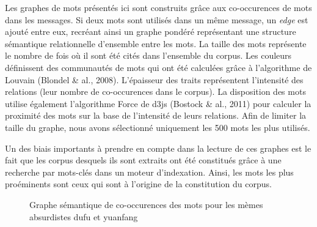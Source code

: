 Les graphes de mots pr\'esent\'es ici sont construits gr\^ace aux
co-occurences de mots dans les messages. Si deux mots sont utilis\'es
dans un m\^eme message, un \textit{edge} est ajout\'e entre eux,
recr\'eant ainsi un graphe pond\'er\'e repr\'esentant une structure
s\'emantique relationnelle d{\textquoteright}ensemble entre les mots.
La taille des mots repr\'esente le nombre de fois o\`u il sont \'et\'e
cit\'es dans l{\textquoteright}ensemble du corpus. Les couleurs
d\'efinissent des communaut\'es de mots qui ont \'et\'e calcul\'ees
gr\^ace \`a l{\textquoteright}algorithme de Louvain (Blondel \& al.,
2008). L{\textquoteright}\'epaisseur des traits repr\'esentent
l{\textquoteright}intensit\'e des relations (leur nombre de
co-occurences dans le corpus). La disposition des mots utilise
\'egalement l{\textquoteright}algorithme Force de d3js (Bostock \& al.,
2011) pour calculer la proximit\'e des mots sur la base de
l{\textquoteright}intensit\'e de leurs relations. Afin de limiter la
taille du graphe, nous avons s\'electionn\'e uniquement les 500 mots
les plus utilis\'es. 


Un des biais importants \`a prendre en compte dans la lecture de ces
graphes est le fait que les corpus desquels ils sont extraits ont
\'et\'e constitu\'es gr\^ace \`a une recherche par mots-cl\'es dans un
moteur d{\textquoteright}indexation. Ainsi, les mots les plus
pro\'eminents sont ceux qui sont \`a l{\textquoteright}origine de la
constitution du corpus.

\begin{figure}
    \centering
    
  \caption{
    Graphe s\'emantique de co-occurences des mots pour les m\`emes absurdistes dufu et yuanfang   
  }
\end{figure}
 

